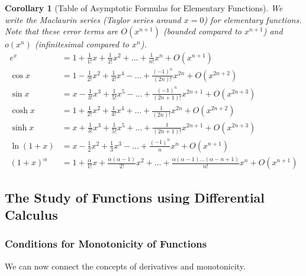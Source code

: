 \documentclass{article}
\newtheorem{corollary}{Corollary}[theorem]
\theoremstyle{remark}
\theoremstyle{definition}
\begin{document}
\begin{corollary}[Table of Asymptotic Formulas for Elementary Functions]
We write the Maclaurin series (Taylor series around $x = 0$) for elementary functions. Note that these error terms are $O(x^{n+1})$ (bounded compared to $x^{n+1}$) and $o(x^n)$ (infinitesimal compared to $x^n$). 
\begin{align*}
    e^x & = 1 + \frac{1}{1!} x + \frac{1}{2!} x^2 + \ldots + \frac{1}{n!} x^n + O(x^{n+1}) \\
    \cos{x} & = 1 - \frac{1}{2!} x^2 + \frac{1}{4!}x^4 - \ldots + \frac{(-1)^n}{(2n)!} x^{2n} + O(x^{2n+2}) \\
    \sin{x} & = x - \frac{1}{3!} x^3 + \frac{1}{5!}x^5 - \ldots + \frac{(-1)^n}{(2n+1)!} x^{2n+1} + O(x^{2n+3}) \\
    \cosh{x} & = 1 + \frac{1}{2!} x^2 + \frac{1}{4!} x^4 + \ldots + \frac{1}{(2n)!} x^{2n} + O(x^{2n+2}) \\
    \sinh{x} & = x + \frac{1}{3!} x^3 + \frac{1}{5!} x^5 + \ldots + \frac{1}{(2n+1)!} x^{2n+1} + O(x^{2n+3}) \\
    \ln{(1+x)} & = x - \frac{1}{2}x^2 + \frac{1}{3} x^3 - \ldots + \frac{(-1)^n}{n} x^n + O(x^{n+1}) \\
    (1 + x)^\alpha & = 1 + \frac{\alpha}{1!} x + \frac{\alpha(\alpha-1)}{2!} x^2 + \ldots + \frac{\alpha (\alpha-1) \ldots (\alpha - n + 1)}{n!} x^n + O(x^{n+1})
\end{align*}
\end{corollary}

\subsection{The Study of Functions using Differential Calculus}

\subsubsection{Conditions for Monotonicity of Functions}
We can now connect the concepts of derivatives and monotonicity. 
\end{document}
